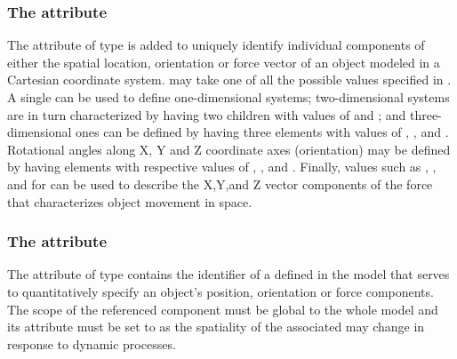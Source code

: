 \subsubsection{The  attribute}
\label{attr:spatialIndex}

The attribute  of type  is added to uniquely identify individual components of either the spatial location, orientation or force vector of an object modeled in a Cartesian coordinate system.  may take one of all the possible  values specified in . A single  \SpatialComponent can be used to define one-dimensional systems; two-dimensional systems are in turn characterized by having two \SpatialComponent children with  values of  and ; and three-dimensional ones can be defined by having three \SpatialComponent elements with  values of , , and . Rotational angles along X, Y and Z coordinate axes (orientation) may be defined by having \SpatialComponent elements with respective  values of , , and . Finally, values such as , , and  for  can be used to describe the X,Y,and Z vector components of the force that characterizes object movement in space.
 
\subsubsection{The  attribute}
\label{attr:variable}

The  attribute of type  contains the identifier of a \Parameter defined in the model that serves to quantitatively specify an object's position, orientation or force components. The scope of the referenced \Parameter component must be global to the whole model and its  attribute must be set to  as the spatiality of the associated \Compartment may change in response to dynamic processes.
